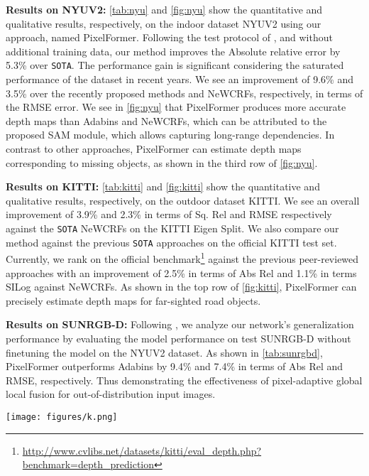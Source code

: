 \documentclass[10pt,twocolumn,letterpaper]{article}
\newcommand{\myfirstpara}[1]{\par \noindent \textbf{#1:}}
\newcommand{\mypara}[1]{\vspace{0.5em} \myfirstpara{#1}}
\newcommand\SOTA{\texttt{SOTA}\xspace}
\begin{document}
\mypara{Results on NYUV2}
\cref{tab:nyu} and \cref{fig:nyu} show the quantitative and qualitative results, respectively, on the indoor dataset NYUV2 using our approach, named PixelFormer. Following the test protocol of \cite{dpt, packnetsan}, and without additional training data, our method improves the Absolute relative error by 5.3\% over \SOTA. The performance gain is significant considering the saturated performance of the dataset in recent years. We see an improvement of 9.6\% and 3.5\% over the recently proposed methods \cite{patil} and NeWCRFs, respectively, in terms of the RMSE error. We see in \cref{fig:nyu} that PixelFormer produces more accurate depth maps than Adabins and NeWCRFs, which can be attributed to the proposed SAM module, which allows capturing long-range dependencies. In contrast to other approaches, PixelFormer can estimate depth maps corresponding to missing objects, as shown in the third row of \cref{fig:nyu}.



\mypara{Results on KITTI}
\cref{tab:kitti} and \cref{fig:kitti} show the quantitative and qualitative results, respectively, on the outdoor dataset KITTI. We see an overall improvement of 3.9\% and 2.3\% in terms of Sq. Rel and RMSE respectively against the \SOTA NeWCRFs \cite{newcrf} on the KITTI Eigen Split. We also compare our method against the previous \SOTA approaches on the official KITTI test set. Currently, we rank  on the official benchmark\footnote{\url{http://www.cvlibs.net/datasets/kitti/eval_depth.php?benchmark=depth_prediction}} against the previous peer-reviewed approaches with an improvement of 2.5\% in terms of Abs Rel and 1.1\% in terms SILog against NeWCRFs. 
As shown in the top row of \cref{fig:kitti}, PixelFormer can precisely estimate depth maps for far-sighted road objects.




\mypara{Results on SUNRGB-D}
Following \cite{adabins}, we analyze our network's generalization performance by evaluating the model performance on test SUNRGB-D without finetuning the model on the NYUV2 dataset. As shown in \cref{tab:sunrgbd}, PixelFormer outperforms Adabins by 9.4\% and 7.4\% in terms of Abs Rel and RMSE, respectively. Thus demonstrating the effectiveness of pixel-adaptive global local fusion for out-of-distribution input images.

\begin{figure*}[t]
\texttt{[image: figures/k.png]}
\caption{Qualitative comparison of previous state-of-the-art method NeWCRFs on the outdoor dataset KITTI.}
\label{fig:kitti}
\end{figure*} 
\end{document}
